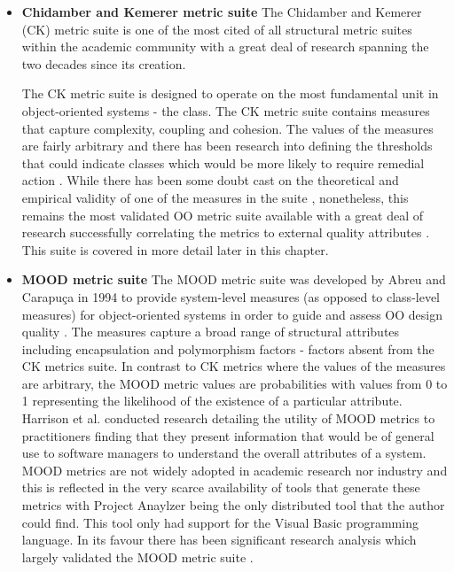 \begin{itemize}
\item \textbf{Chidamber and Kemerer metric suite} The Chidamber and Kemerer (CK) metric suite is one of the most cited of all structural metric suites within the academic community \citep{pressman2005software} with a great deal of research spanning the two decades since its creation. 

The CK metric suite is designed to operate on the most fundamental unit in object-oriented systems - the class. The CK metric suite contains measures that capture complexity, coupling and cohesion. The values of the measures are fairly arbitrary and there has been research into defining the thresholds that could indicate classes which would be more likely to require remedial action \citep{rosenberg1998applying}. While there has been some doubt cast on the theoretical and empirical validity of one of the measures in the suite \citep{fenton2014software}, nonetheless, this remains the most validated OO metric suite available \citep{kitchenham2010s} with a great deal of research successfully correlating the metrics to external quality attributes \citep{rosenberg1998applying, el2001prediction, basili1984software, subramanyam2003empirical}. This suite is covered in more detail later in this chapter.

\item \textbf{MOOD metric suite} The MOOD metric suite was developed by Abreu and Carapu\c{c}a in 1994 to provide system-level measures (as opposed to class-level measures) for object-oriented systems in order to guide and assess OO design quality \citep{abreu1994object}. The measures capture a broad range of structural attributes including encapsulation and polymorphism factors - factors absent from the CK metrics suite. In contrast to CK metrics where the values of the measures are arbitrary, the MOOD metric values are probabilities with values from 0 to 1 representing the likelihood of the existence of a particular attribute. Harrison et al. conducted research detailing the utility of MOOD metrics to practitioners \citep{harrison1998investigation} finding that they present information that would be of general use to software managers to understand the overall attributes of a system. MOOD metrics are not widely adopted in academic research nor industry and this is reflected in the very scarce availability of tools that generate these metrics with Project Anaylzer \citep{abounader1997data} being the only distributed tool that the author could find. This tool only had support for the Visual Basic programming language. In its favour there has been significant research analysis which largely validated the MOOD metric suite \citep{abounader1997data, harrison1998evaluation}.


\end{itemize}
